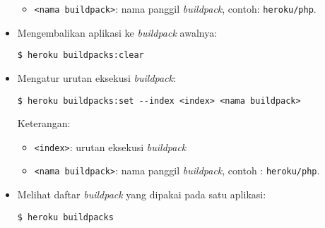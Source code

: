\begin{itemize}
\begin{itemize}
\item \texttt{<nama buildpack>}: nama panggil \textit{buildpack}, contoh: \texttt{heroku/php}.
\end{itemize}
\item Mengembalikan aplikasi ke \textit{buildpack} awalnya:
\begin{lstlisting}
$ heroku buildpacks:clear	
\end{lstlisting}
\item Mengatur urutan eksekusi \textit{buildpack}:
\begin{lstlisting}
$ heroku buildpacks:set --index <index> <nama buildpack>
\end{lstlisting}
Keterangan:
\begin{itemize}
\item \texttt{<index>}: urutan eksekusi \textit{buildpack}
\item \texttt{<nama buildpack>}: nama panggil \textit{buildpack}, contoh : \texttt{heroku/php}.
\end{itemize}
\item Melihat daftar \textit{buildpack} yang dipakai pada satu aplikasi:
\begin{lstlisting}
$ heroku buildpacks
\end{lstlisting}
\end{itemize}

